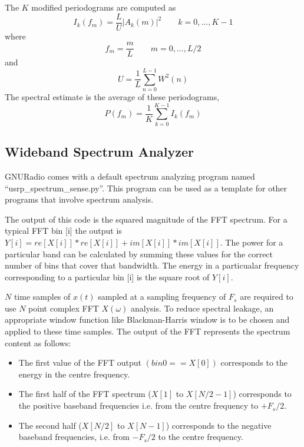 The $K$ modified periodograms are computed as 
\begin{equation*}
    I_k(f_m) = \frac{L}{U}\left|A_k(m)\right|^2 \qquad k = 0, ..., K-1
\end{equation*}
where
\begin{equation*}
    f_m = \frac{m}{L} \qquad m = 0, ..., L/2
\end{equation*}
and
\begin{equation*}
    U = \frac{1}{L}\sum_{n=0}^{L-1}W^2(n)
\end{equation*}
The spectral estimate is the average of these periodograms,
\begin{equation*}
    P(f_m) = \frac{1}{K}\sum_{k=0}^{K-1}I_k(f_m)
\end{equation*}

\subsection{Wideband Spectrum Analyzer}

GNURadio comes with a default spectrum analyzing program named 
``usrp\_spectrum\_sense.py''. This program can be used as a template for other
programs that involve spectrum analysis.

The output of this code is the squared magnitude of the FFT spectrum. For a 
typical FFT bin [i] the output is 
$Y[i] = re[X[i]]*re[X[i]] + im[X[i]]*im[X[i]]$. The power for a particular 
band can be calculated by summing these values for the correct number of bins
that cover that bandwidth. The energy in a particualar frequency corresponding
to a particular bin [i] is the square root of $Y[i]$. 

$N$ time samples of $x(t)$ sampled at a sampling frequency of $F_{s}$ are 
required to use $N$ point complex FFT $X(\omega)$ analysis. To reduce spectral
leakage, an appropriate window function like Blackman-Harris window is to be 
chosen  and applied to these time samples. The output of the FFT represents 
the spectrum content as follows:

\begin{itemize}
    \item The first value of the FFT output $(bin0 == X[0])$ corresponds to 
    the energy in the centre frequency.
    \item The first half of the FFT spectrum ($X[1]$ to $X[N/2-1]$) 
    corresponds to the positive baseband frequencies i.e. from the centre 
    frequency to $+F_{s}/2$.
    \item The second half ($X[N/2]$ to $X[N-1]$) corresponds to the negative 
    baseband frequencies, i.e. from $-F_{s}/2$ to the centre frequency.
\end{itemize}


